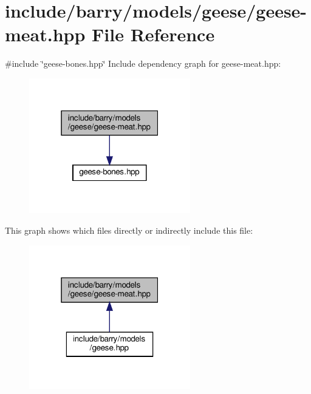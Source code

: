 \hypertarget{geese-meat_8hpp}{}\section{include/barry/models/geese/geese-\/meat.hpp File Reference}
\label{geese-meat_8hpp}
{\ttfamily \#include \char`\"{}geese-\/bones.\+hpp\char`\"{}}\newline
Include dependency graph for geese-\/meat.hpp\+:
\nopagebreak
\begin{figure}[H]
\begin{center}
\leavevmode
\includegraphics[width=199pt]{geese-meat_8hpp__incl}
\end{center}
\end{figure}
This graph shows which files directly or indirectly include this file\+:
\nopagebreak
\begin{figure}[H]
\begin{center}
\leavevmode
\includegraphics[width=199pt]{geese-meat_8hpp__dep__incl}
\end{center}
\end{figure}
